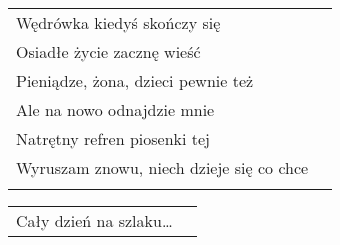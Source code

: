 \documentclass[a5paper]{article}
\begin{document}
\noindent
\begin{tabular}{@{}p{8.5cm}p{3cm}@{}}
Wędrówka kiedyś skończy się\\
Osiadłe życie zacznę wieść\\
Pieniądze, żona, dzieci pewnie też\\
Ale na nowo odnajdzie mnie\\
Natrętny refren piosenki tej\\
Wyruszam znowu, niech dzieje się co chce\\\\
\end{tabular}

\noindent
\begin{tabular}{@{}p{8.5cm}p{3cm}@{}}
Cały dzień na szlaku…
\end{tabular}
\end{document}
